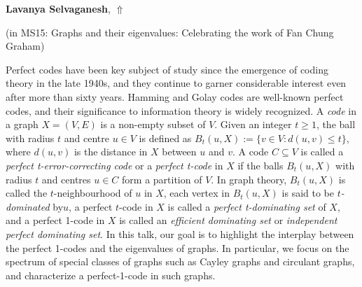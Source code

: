 \documentclass[ILAS2025-program.tex]{subfiles}
\begin{document}
     \hypertarget{down0030}{}\begin{ilasabstract}
    
    \textbf{Lavanya Selvaganesh},  \hfill \hyperlink{up0030}{$\Uparrow$}
    
    (in {\color{mstitle}MS15: Graphs and their eigenvalues: Celebrating the work of Fan Chung Graham})
        
        \mtskip
    Perfect codes have been key subject of study since the emergence of coding theory in the late 1940s, and they continue to garner considerable interest even after more than sixty years. Hamming and Golay codes are well-known perfect codes, and their significance to information theory is widely recognized. A \textit{code} in a graph $X=(V,E)$ is a non-empty subset of $V$. Given an integer $t\geq 1$, the ball with radius $t$ and centre $u \in V$ is defined as $B_t(u, X) := \{v \in V: d(u, v) \leq t\}$, where $d(u,v)$ is the distance in $X$ between $u$ and $v$. A code $C\subseteq V$ is called a \textit{perfect t-error-correcting code} or a \textit{perfect t-code} in $X$ if the balls $B_t(u, X)$ with radius $t$ and centres $u\in C$ form a partition of $V$. In graph theory, $B_t(u, X)$ is called the $t$-neighbourhood of $u$ in $X$, each vertex in $B_t(u, X)$ is said to be \textit{$t$-dominated} by$u$, a perfect $t$-code in $X$ is called a \textit{perfect t-dominating set} of $X$, and a perfect 1-code in $X$ is called an \textit{efficient dominating set} or \textit{independent perfect dominating set}. In this talk, our goal is to highlight the interplay between the perfect 1-codes and the eigenvalues of graphs. In particular, we focus on the spectrum of special classes of graphs such as Cayley graphs and circulant graphs, and characterize a perfect-1-code in such graphs.  

\end{ilasabstract}
\end{document}
